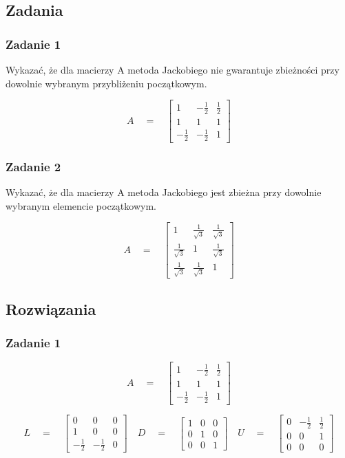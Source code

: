 \documentclass[a4paper]{article}
\begin{document}
\subsection{Zadania}
\subsubsection{Zadanie 1}
Wykazać, że dla macierzy A metoda Jackobiego nie gwarantuje zbieżności przy dowolnie wybranym przybliżeniu początkowym.

$$A \quad = \quad 
\begin{bmatrix}
1 & -\frac{1}{2} &  \frac{1}{2} \\
 1 & 1 &  1 \\
 -\frac{1}{2} &  -\frac{1}{2} & 1
\end{bmatrix}
$$


\subsubsection{Zadanie 2}
Wykazać, że dla macierzy A metoda Jackobiego jest zbieżna przy dowolnie wybranym elemencie początkowym.

$$A \quad = \quad 
\begin{bmatrix}
1 & \frac{1}{\sqrt{3}} &  \frac{1}{\sqrt{3}} \\
 \frac{1}{\sqrt{3}} & 1 &  \frac{1}{\sqrt{3}} \\
 \frac{1}{\sqrt{3}} &  \frac{1}{\sqrt{3}} & 1
\end{bmatrix}
$$


\subsection{Rozwiązania}

\subsubsection{Zadanie 1}
$$A \quad = \quad 
\begin{bmatrix}
1 & -\frac{1}{2} &  \frac{1}{2} \\
 1 & 1 &  1 \\
 -\frac{1}{2} &  -\frac{1}{2} & 1
\end{bmatrix}
$$

$$L \quad = \quad 
\begin{bmatrix}
0 & 0 &  0 \\
 1 & 0 &  0 \\
 -\frac{1}{2} &  -\frac{1}{2} & 0
\end{bmatrix}
\quad
D \quad = \quad 
\begin{bmatrix}
1 & 0 &  0 \\
 0 & 1 &  0 \\
 0 &  0 & 1
\end{bmatrix}
\quad
U \quad = \quad 
\begin{bmatrix}
0 & -\frac{1}{2} &  \frac{1}{2} \\
0 & 0 &  1 \\
 0 &  0 & 0
\end{bmatrix}
$$
\end{document}
